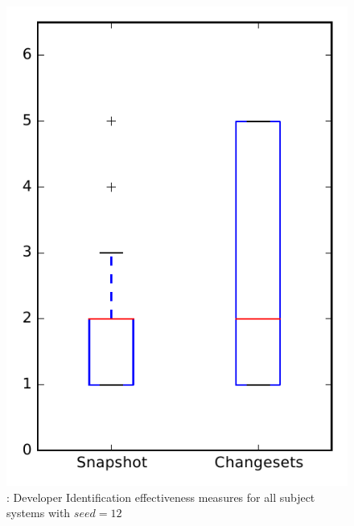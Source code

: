 
\begin{figure}
\centering
\includegraphics[height=0.4\textheight]{figures/dit_seed/rq1_overview_12}
\caption{\rtwo: Developer Identification effectiveness measures for all subject systems with $seed=12$}
\label{fig:dit_seed:rq1:overview}
\end{figure}
